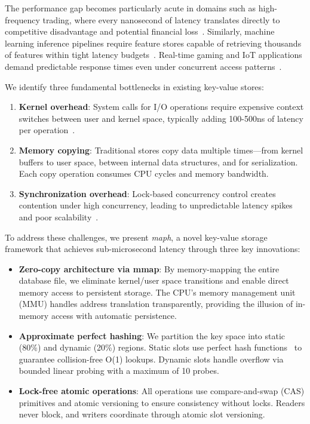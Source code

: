 \documentclass[11pt]{article}
\begin{document}
The performance gap becomes particularly acute in domains such as high-frequency trading, where every nanosecond of latency translates directly to competitive disadvantage and potential financial loss~\cite{hft-latency}. Similarly, machine learning inference pipelines require feature stores capable of retrieving thousands of features within tight latency budgets~\cite{ml-serving}. Real-time gaming and IoT applications demand predictable response times even under concurrent access patterns~\cite{gaming-latency}.

We identify three fundamental bottlenecks in existing key-value stores:

\begin{enumerate}
\item \textbf{Kernel overhead}: System calls for I/O operations require expensive context switches between user and kernel space, typically adding 100-500ns of latency per operation~\cite{syscall-overhead}.

\item \textbf{Memory copying}: Traditional stores copy data multiple times—from kernel buffers to user space, between internal data structures, and for serialization. Each copy operation consumes CPU cycles and memory bandwidth.

\item \textbf{Synchronization overhead}: Lock-based concurrency control creates contention under high concurrency, leading to unpredictable latency spikes and poor scalability~\cite{lock-contention}.
\end{enumerate}

To address these challenges, we present \textit{maph}, a novel key-value storage framework that achieves sub-microsecond latency through three key innovations:

\begin{itemize}
\item \textbf{Zero-copy architecture via mmap}: By memory-mapping the entire database file, we eliminate kernel/user space transitions and enable direct memory access to persistent storage. The CPU's memory management unit (MMU) handles address translation transparently, providing the illusion of in-memory access with automatic persistence.

\item \textbf{Approximate perfect hashing}: We partition the key space into static (80\%) and dynamic (20\%) regions. Static slots use perfect hash functions~\cite{chd-algorithm,bbhash} to guarantee collision-free O(1) lookups. Dynamic slots handle overflow via bounded linear probing with a maximum of 10 probes.

\item \textbf{Lock-free atomic operations}: All operations use compare-and-swap (CAS) primitives and atomic versioning to ensure consistency without locks. Readers never block, and writers coordinate through atomic slot versioning.
\end{itemize}
\end{document}
